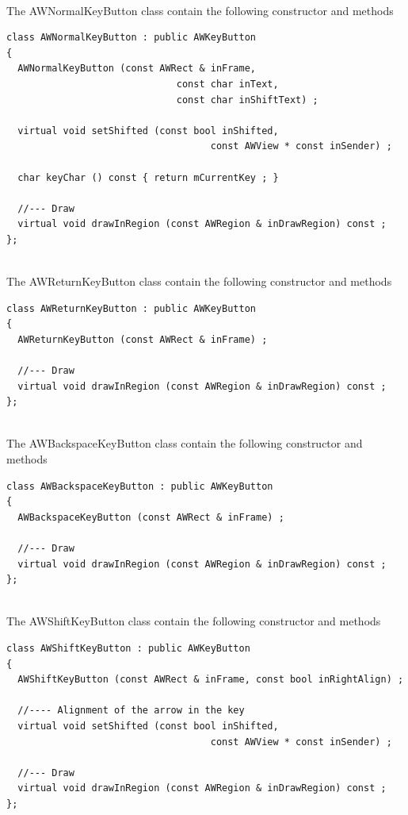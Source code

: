 \documentclass[a4paper,11pt]{extarticle}
\begin{document}
~\\ The AWNormalKeyButton class contain the following constructor and methods

\begin{lstlisting}[language=Arduinonl]
class AWNormalKeyButton : public AWKeyButton
{
  AWNormalKeyButton (const AWRect & inFrame,
                              const char inText,
                              const char inShiftText) ;
  
  virtual void setShifted (const bool inShifted,
                                    const AWView * const inSender) ;
  
  char keyChar () const { return mCurrentKey ; }
  
  //--- Draw
  virtual void drawInRegion (const AWRegion & inDrawRegion) const ;
};
\end{lstlisting}

~\\ The AWReturnKeyButton class contain the following constructor and methods

\begin{lstlisting}[language=Arduinonl]
class AWReturnKeyButton : public AWKeyButton
{
  AWReturnKeyButton (const AWRect & inFrame) ;
  
  //--- Draw
  virtual void drawInRegion (const AWRegion & inDrawRegion) const ;
};
\end{lstlisting}

~\\ The AWBackspaceKeyButton class contain the following constructor and methods

\begin{lstlisting}[language=Arduinonl]
class AWBackspaceKeyButton : public AWKeyButton
{
  AWBackspaceKeyButton (const AWRect & inFrame) ;
  
  //--- Draw
  virtual void drawInRegion (const AWRegion & inDrawRegion) const ;
};
\end{lstlisting}

~\\ The AWShiftKeyButton class contain the following constructor and methods

\begin{lstlisting}[language=Arduinonl]
class AWShiftKeyButton : public AWKeyButton
{
  AWShiftKeyButton (const AWRect & inFrame, const bool inRightAlign) ;
  
  //---- Alignment of the arrow in the key
  virtual void setShifted (const bool inShifted,
                                    const AWView * const inSender) ;
  
  //--- Draw
  virtual void drawInRegion (const AWRegion & inDrawRegion) const ;
};
\end{lstlisting}
\end{document}
